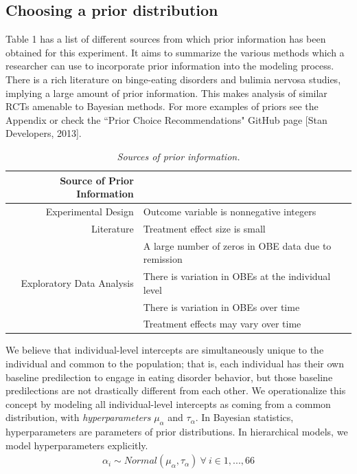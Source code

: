 \documentclass{article}
\begin{document}
\subsection*{Choosing a prior distribution}
Table 1 has a list of different sources from which prior information has been obtained for this experiment. It aims to summarize the various methods which a researcher can use to incorporate prior information into the modeling process. There is a rich literature on binge-eating disorders and bulimia nervosa studies, implying a large amount of prior information. This makes analysis of similar RCTs amenable to Bayesian methods. For more examples of priors see the Appendix or check the ``Prior Choice Recommendations" GitHub page [Stan Developers, 2013].
%
\begin{table}[H]
\centering
\begin{tabular}{r l}
  Source of Prior Information &  \\ 
  \hline  \vspace{0.25em}
  Experimental Design & Outcome variable is nonnegative integers \\
  \vspace{0.25em}
  Literature & Treatment effect size is small \\
                  & A large number of zeros in OBE data due to remission\\
  Exploratory Data Analysis & There is variation in OBEs at the individual level \\
					  & There is variation in OBEs over time \\
                                            & Treatment effects may vary over time \\
    \hline
\end{tabular}
\caption{\emph{Sources of prior information.}}
\end{table}
%
We believe that individual-level intercepts are simultaneously unique to the individual and common to the population; that is, each individual has their own baseline predilection to engage in eating disorder behavior, but those baseline predilections are not drastically different from each other.  We operationalize this concept by modeling all individual-level intercepts as coming from a common distribution, with \emph{hyperparameters} $\mu_{\alpha}$ and $\tau_{\alpha}$.  In Bayesian statistics, hyperparameters are parameters of prior distributions.  In hierarchical models, we model hyperparameters explicitly.
%
\begin{align}
\alpha_i \sim Normal(\mu_{\alpha}, \tau_{\alpha}) \ \forall \ i \in 1,...,66
\end{align} 
\end{document}
